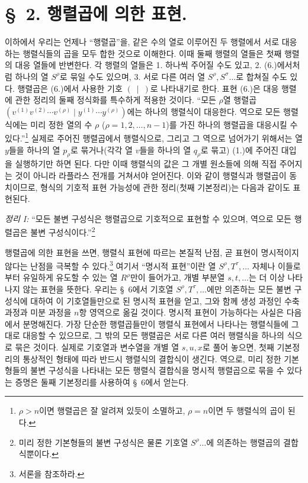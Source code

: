 
\section*{\S\ 2. 행렬곱에 의한 표현.}
이하에서 우리는 언제나 ``행렬곱''을, 같은 수의 열로 이루어진 두 행렬에서 서로 대응하는 행렬식들의 곱을 모두 합한 것으로 이해한다. 이때 둘째 행렬의 열들은 첫째 행렬의 대응 열들에 반변한다. 각 행렬의 열들은 1. 하나씩 주어질 수도 있고, 2. (6.)에서처럼 하나의 열 $S^\rho$로 묶일 수도 있으며, 3. 서로 다른 여러 열 $S^\rho,S^\sigma\ldots$로 합쳐질 수도 있다. 행렬곱은 (6.)에서 사용한 기호 $(\ \mid\ )$로 나타내기로 한다. 표현 (6.)은 대응 행렬에 관한 정리의 둘째 정식화를 특수하게 적용한 것이다. ``모든 $\rho$열 행렬곱 $(v^{(1)}v^{(2)}\cdots v^{(\rho)}\mid y^{(1)}\cdots y^{(\rho)})$에는 하나의 행렬식이 대응한다. 역으로 모든 행렬식에는 미리 정한 열의 수 $\rho$ ($\rho=1,2,\ldots,n-1$)를 가진 하나의 행렬곱을 대응시킬 수 있다.''\footnote{$\rho>n$이면 행렬곱은 잘 알려져 있듯이 소멸하고, $\rho=n$이면 두 행렬식의 곱이 된다.} 실제로 주어진 행렬곱에서 행렬식으로, 그리고 그 역으로 넘어가기 위해서는 열 $y$들을 하나의 열 $p_\rho$로 묶거나(각각 열 $v$들을 하나의 열 $q_\rho$로 묶고) (1.)에 주어진 대입을 실행하기만 하면 된다. 다만 이때 행렬식의 값은 그 개별 원소들에 의해 직접 주어지는 것이 아니라 라플라스 전개를 거쳐서야 얻어진다. 이와 같이 행렬식과 행렬곱이 동치이므로, 형식의 기호적 표현 가능성에 관한 정리(첫째 기본정리)는 다음과 같이도 표현된다.

\emph{정리 I:} ``모든 불변 구성식은 행렬곱으로 기호적으로 표현할 수 있으며, 역으로 모든 행렬곱은 불변 구성식이다.''\footnote{미리 정한 기본형들의 불변 구성식은 물론 기호열 $S^\rho\ldots$에 의존하는 행렬곱의 결합식뿐이다.}

행렬곱에 의한 표현을 쓰면, 행렬식 표현에 따르는 본질적 난점, 곧 표현이 명시적이지 않다는 난점을 극복할 수 있다.\footnote{서론을 참조하라.} 여기서 ``명시적 표현''이란 열 $S^\rho,T^\tau,\ldots$ 자체나 이들로부터 유일하게 유도할 수 있는 열 $R^\rho$만이 들어가고, 개별 부분열 $s,t,\ldots$는 더 이상 나타나지 않는 표현을 뜻한다. 우리는 \S\ 6에서 기호열 $S^\rho,T^\tau,\ldots$에만 의존하는 모든 불변 구성식에 대하여 이 기호열들만으로 된 명시적 표현을 얻고, 그와 함께 생성 과정인 수축 과정과 미분 과정을 $n$항 영역으로 옮길 것이다. 명시적 표현이 가능하다는 사실은 다음에서 분명해진다. 가장 단순한 행렬곱들만이 행렬식 표현에서 나타나는 행렬식들에 그대로 대응할 수 있으므로, 그 밖의 모든 행렬곱은 서로 다른 여러 행렬식을 하나의 식으로 묶은 것이다. 실제로 기호열과 변수열을 개별 열 $s,u,x$로 풀어 놓으면, 첫째 기본정리의 통상적인 형태에 따라 반드시 행렬식의 결합식이 생긴다. 역으로, 미리 정한 기본형들의 불변 구성식을 나타내는 모든 행렬식 결합식을 명시적 행렬곱으로 묶을 수 있다는 증명은 둘째 기본정리를 사용하여 \S\ 6에서 얻는다.
